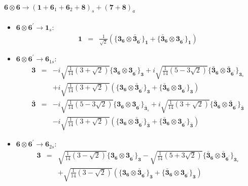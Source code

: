 \documentclass[english]{article}
\newcommand{\subcg}[3]{\big\{ {#1}\otimes{#2}\big\}^{}_{#3}}
\newcommand{\rep}[1]{\mathbf{#1}}
\begin{document}
\paragraph*{\Large $\rep{6}\otimes\rep{6}\to\left(\rep{1}+\rep{6}_{1}+\rep{6}_{2}+\rep{8}\right)_s+\left(\rep{7}+\rep{8}\right)_a$}
\begin{itemize}
\item $\rep{6}\otimes\rep{6^{\prime}}\to\rep{1}_{s}$:
\begin{eqnarray*}
\rep{1} &=& \frac{1}{\sqrt{2}}\left(\subcg{\rep{3}_{\rep{6}}}{\rep{\bar{3}}_{\rep{6^{\prime}}}}{\rep{1}}+\subcg{\rep{\bar{3}}_{\rep{6}}}{\rep{3}_{\rep{6^{\prime}}}}{\rep{1}}\right)
\end{eqnarray*}
\item $\rep{6}\otimes\rep{6^{\prime}}\to\rep{6}_{1s}$:
\begin{eqnarray*}
\rep{3} &=& -i \sqrt{\frac{1}{14} \left(3+\sqrt{2}\right)}\subcg{\rep{3}_{\rep{6}}}{\rep{3}_{\rep{6^{\prime}}}}{\rep{3}}+i \sqrt{\frac{1}{14} \left(5-3 \sqrt{2}\right)}\subcg{\rep{\bar{3}}_{\rep{6}}}{\rep{\bar{3}}_{\rep{6^{\prime}}}}{\rep{3}_{s}} \\ 
 & & +i \sqrt{\frac{1}{14} \left(3+\sqrt{2}\right)}\left(\subcg{\rep{3}_{\rep{6}}}{\rep{\bar{3}}_{\rep{6^{\prime}}}}{\rep{3}}+\subcg{\rep{\bar{3}}_{\rep{6}}}{\rep{3}_{\rep{6^{\prime}}}}{\rep{3}}\right)
\\
\rep{\bar{3}} &=& -i \sqrt{\frac{1}{14} \left(5-3 \sqrt{2}\right)}\subcg{\rep{3}_{\rep{6}}}{\rep{3}_{\rep{6^{\prime}}}}{\rep{\bar{3}}_{s}}+i \sqrt{\frac{1}{14} \left(3+\sqrt{2}\right)}\subcg{\rep{\bar{3}}_{\rep{6}}}{\rep{\bar{3}}_{\rep{6^{\prime}}}}{\rep{\bar{3}}} \\ 
 & & -i \sqrt{\frac{1}{14} \left(3+\sqrt{2}\right)}\left(\subcg{\rep{3}_{\rep{6}}}{\rep{\bar{3}}_{\rep{6^{\prime}}}}{\rep{\bar{3}}}+\subcg{\rep{\bar{3}}_{\rep{6}}}{\rep{3}_{\rep{6^{\prime}}}}{\rep{\bar{3}}}\right)
\end{eqnarray*}
\item $\rep{6}\otimes\rep{6^{\prime}}\to\rep{6}_{2s}$:
\begin{eqnarray*}
\rep{3} &=& \sqrt{\frac{1}{14} \left(3-\sqrt{2}\right)}\subcg{\rep{3}_{\rep{6}}}{\rep{3}_{\rep{6^{\prime}}}}{\rep{3}}-\sqrt{\frac{1}{14} \left(5+3 \sqrt{2}\right)}\subcg{\rep{\bar{3}}_{\rep{6}}}{\rep{\bar{3}}_{\rep{6^{\prime}}}}{\rep{3}_{s}} \\ 
 & & +\sqrt{\frac{1}{14} \left(3-\sqrt{2}\right)}\left(\subcg{\rep{3}_{\rep{6}}}{\rep{\bar{3}}_{\rep{6^{\prime}}}}{\rep{3}}+\subcg{\rep{\bar{3}}_{\rep{6}}}{\rep{3}_{\rep{6^{\prime}}}}{\rep{3}}\right)

\end{eqnarray*}
\end{itemize}
\end{document}
